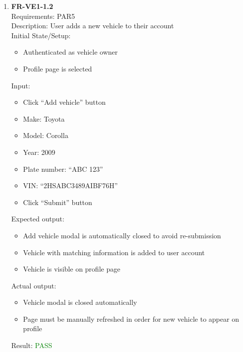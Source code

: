 \documentclass[12pt, titlepage]{article}
\newcommand{\testpass}{\textcolor{green}{PASS}}
\begin{document}
\begin{enumerate}
                \item \textbf{FR-VE1-1.2} \label{FR-VE1-1.2} \\ Requirements: PAR5 \\
                    Description: User adds a new vehicle to their account \\
                    Initial State/Setup: \begin{itemize}
                        \item Authenticated as vehicle owner
                        \item Profile page is selected
                    \end{itemize}
                    Input: \begin{itemize}
                        \item Click ``Add vehicle'' button
                        \item Make: Toyota
                        \item Model: Corolla
                        \item Year: 2009
                        \item Plate number: ``ABC 123''
                        \item VIN: ``2HSABC3489AIBF76H''
                        \item Click ``Submit'' button
                    \end{itemize}
                    Expected output: \begin{itemize}
                        \item Add vehicle modal is automatically closed to avoid re-submission
                        \item Vehicle with matching information is added to user account
                        \item Vehicle is visible on profile page
                    \end{itemize}
                    Actual output: \begin{itemize}
                        \item Vehicle modal is closed automatically
                        \item Page must be manually refreshed in order for new vehicle to appear on profile
                    \end{itemize}
                    Result: \testpass


\end{enumerate}
\end{document}
